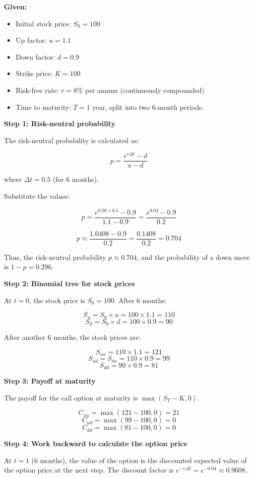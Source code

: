 \documentclass[12pt,letterpaper, onecolumn]{exam}
\begin{document}
\begin{solution}
\textbf{Given:}
\begin{itemize}
    \item Initial stock price: \( S_0 = 100 \)
    \item Up factor: \( u = 1.1 \)
    \item Down factor: \( d = 0.9 \)
    \item Strike price: \( K = 100 \)
    \item Risk-free rate: \( r = 8\% \) per annum (continuously compounded)
    \item Time to maturity: \( T = 1 \) year, split into two 6-month periods.
\end{itemize}

\textbf{Step 1: Risk-neutral probability}

The risk-neutral probability is calculated as:

\[
p = \frac{e^{r \Delta t} - d}{u - d}
\]

where \( \Delta t = 0.5 \) (for 6 months).

Substitute the values:

\[
p = \frac{e^{0.08 \times 0.5} - 0.9}{1.1 - 0.9} = \frac{e^{0.04} - 0.9}{0.2}
\]

\[
p \approx \frac{1.0408 - 0.9}{0.2} = \frac{0.1408}{0.2} = 0.704
\]

Thus, the risk-neutral probability \( p \approx 0.704 \), and the probability of a down move is \( 1 - p = 0.296 \).

\textbf{Step 2: Binomial tree for stock prices}

At \( t = 0 \), the stock price is \( S_0 = 100 \). After 6 months:

\[
S_u = S_0 \times u = 100 \times 1.1 = 110
\]
\[
S_d = S_0 \times d = 100 \times 0.9 = 90
\]

After another 6 months, the stock prices are:

\[
S_{uu} = 110 \times 1.1 = 121
\]
\[
S_{ud} = S_{du} = 110 \times 0.9 = 99
\]
\[
S_{dd} = 90 \times 0.9 = 81
\]

\textbf{Step 3: Payoff at maturity}

The payoff for the call option at maturity is \( \max(S_T - K, 0) \).

\[
C_{uu} = \max(121 - 100, 0) = 21
\]
\[
C_{ud} = \max(99 - 100, 0) = 0
\]
\[
C_{dd} = \max(81 - 100, 0) = 0
\]

\textbf{Step 4: Work backward to calculate the option price}

At \( t = 1 \) (6 months), the value of the option is the discounted expected value of the option price at the next step. The discount factor is \( e^{-r \Delta t} = e^{-0.04} \approx 0.9608 \).


\end{solution}
\end{document}
